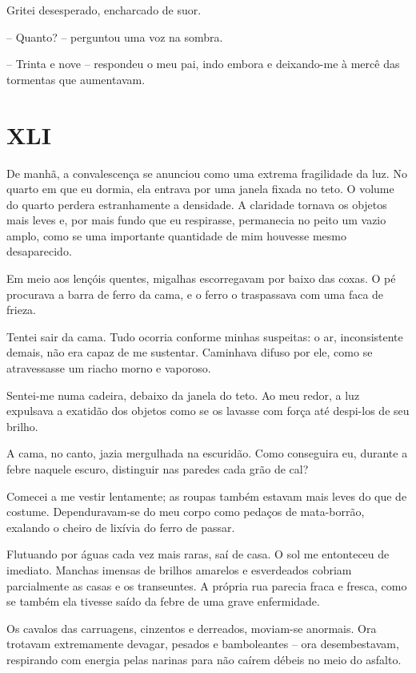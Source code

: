 Gritei desesperado, encharcado de suor.

-- Quanto? -- perguntou uma voz na sombra.

-- Trinta e nove -- respondeu o meu pai, indo embora e deixando-me à mercê das tormentas que aumentavam.


\chapter*{\centering\Large{XLI}}

De manhã, a convalescença se anunciou como uma extrema fragilidade da luz. No quarto em que eu dormia, ela entrava por uma janela fixada no teto. O volume do quarto perdera estranhamente a densidade. A claridade tornava os objetos mais leves e, por mais fundo que eu respirasse, permanecia no peito um vazio amplo, como se uma importante quantidade de mim houvesse mesmo desaparecido.

Em meio aos lençóis quentes, migalhas escorregavam por baixo das coxas. O pé procurava a barra de ferro da cama, e o ferro o traspassava com uma faca de frieza.

Tentei sair da cama. Tudo ocorria conforme minhas suspeitas: o ar, inconsistente demais, não era capaz de me sustentar. Caminhava difuso por ele, como se atravessasse um riacho morno e vaporoso.

Sentei-me numa cadeira, debaixo da janela do teto. Ao meu redor, a luz expulsava a exatidão dos objetos como se os lavasse com força até despi-los de seu brilho.

A cama, no canto, jazia mergulhada na escuridão. Como conseguira eu, durante a febre naquele escuro, distinguir nas paredes cada grão de cal?

Comecei a me vestir lentamente; as roupas também estavam mais leves do que de costume. Dependuravam-se do meu corpo como pedaços de mata-borrão, exalando o cheiro de lixívia do ferro de passar.

Flutuando por águas cada vez mais raras, saí de casa. O sol me entonteceu de imediato. Manchas imensas de brilhos amarelos e esverdeados cobriam parcialmente as casas e os transeuntes. A própria rua parecia fraca e fresca, como se também ela tivesse saído da febre de uma grave enfermidade.

Os cavalos das carruagens, cinzentos e derreados, moviam-se anormais. Ora trotavam extremamente devagar, pesados e bamboleantes -- ora desembestavam, respirando com energia pelas narinas para não caírem débeis no meio do asfalto.

